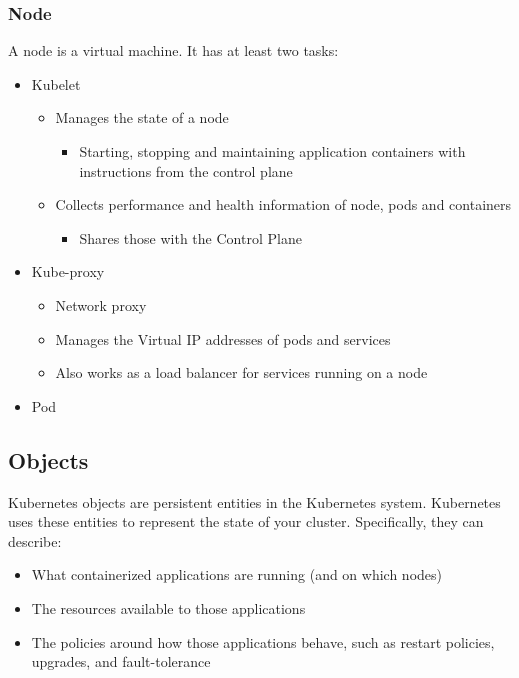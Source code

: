 \documentclass{article}
\begin{document}
\subsubsection{Node}

A node is a virtual machine. It has at least two tasks:

\begin{itemize}
    \item Kubelet
    \begin{itemize}
        \item Manages the state of a node
        \begin{itemize}
            \item Starting, stopping and maintaining application containers with instructions from the control plane
        \end{itemize}
        \item Collects performance and health information of node, pods and containers
        \begin{itemize}
            \item Shares those with the Control Plane
        \end{itemize}
    \end{itemize}
    \item Kube-proxy
    \begin{itemize}
        \item Network proxy
        \item Manages the Virtual IP addresses of pods and services
        \item Also works as a load balancer for services running on a node
    \end{itemize}
    \item Pod
\end{itemize}

\subsection{Objects}

Kubernetes objects are persistent entities in the Kubernetes system. 
Kubernetes uses these entities to represent the state of your cluster. Specifically, they can describe:

\begin{itemize}
    \item What containerized applications are running (and on which nodes)
    \item The resources available to those applications
    \item The policies around how those applications behave, such as restart policies, upgrades, and fault-tolerance
\end{itemize}
\end{document}
